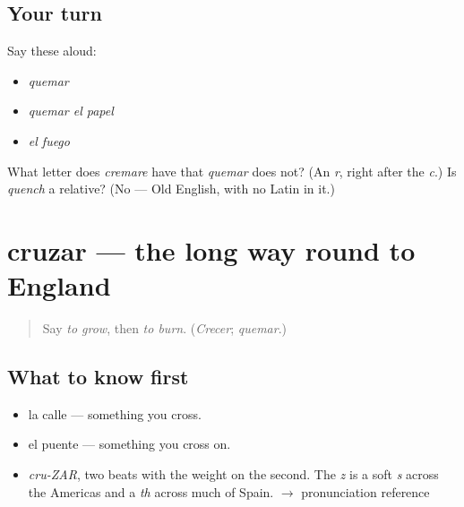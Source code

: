 \subsection*{Your turn}
Say these aloud:

\begin{itemize}
\raggedright
  \item \emph{quemar}
  \item \emph{quemar el papel}
  \item \emph{el fuego}
\end{itemize}

\begin{tcolorbox}[breakable,colback=teal!4,colframe=teal!35!black,title={Before you move on}]
What letter does \emph{cremare} have that \emph{quemar} does not? (An \emph{r}, right after the \emph{c}.) Is \emph{quench} a relative? (No — Old English, with no Latin in it.)
\end{tcolorbox}
\section[cruzar]{cruzar — the long way round to England}

\label{lesson:ES-C387-cruzar}



\begin{quote}
Say \emph{to grow}, then \emph{to burn}. (\emph{Crecer}; \emph{quemar}.)
\end{quote}

\subsection*{What to know first}
\begin{itemize}
\raggedright
  \item la calle — something you cross.
  \item el puente — something you cross on.
\end{itemize}

\begin{sounds}
\begin{itemize}
\raggedright
  \item \emph{cru-ZAR}, two beats with the weight on the second. The \emph{z} is a soft \emph{s} across the Americas and a \emph{th} across much of Spain. $\to$ pronunciation reference
\end{itemize}
\end{sounds}

